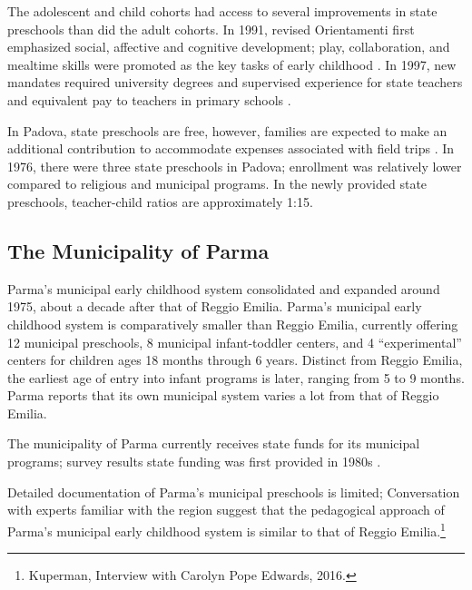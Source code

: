 The adolescent and child cohorts had access to several improvements in state preschools than did the adult cohorts. In 1991, revised Orientamenti first emphasized social, affective and cognitive development; play, collaboration, and mealtime skills were promoted as the key tasks of early childhood \citep{Corsaro_1996_Early-Edu}. In 1997, new mandates required university degrees and supervised experience for state teachers and equivalent pay to teachers in primary schools \citep{Ghedini_2001_Ital-Natl-Policy}. 

In Padova, state preschools are free, however, families are expected to make an additional contribution to accommodate expenses associated with field trips \citep{CEHD_2016_Historical-Analysis}. In 1976, there were three state preschools in Padova; enrollment was relatively lower compared to religious and municipal programs. In the newly provided state preschools, teacher-child ratios are approximately 1:15.

\subsection{The Municipality of Parma}

Parma's municipal early childhood system consolidated and expanded around 1975, about a decade after that of Reggio Emilia. Parma's municipal early childhood system is comparatively smaller than Reggio Emilia, currently offering 12 municipal preschools, 8 municipal infant-toddler centers, and 4 ``experimental'' centers for children ages 18 months through 6 years. Distinct from Reggio Emilia, the earliest age of entry into infant programs is later, ranging from 5 to 9 months. Parma reports that its own municipal system varies a lot from that of Reggio Emilia. 

The municipality of Parma currently receives state funds for its municipal programs; survey results state funding was first provided in 1980s \citep{CEHD_2016_Historical-Analysis}.

Detailed documentation of Parma's municipal preschools is limited; Conversation with experts familiar with the region suggest that the pedagogical approach of Parma's municipal early childhood system is similar to that of Reggio Emilia.\footnote{Kuperman, Interview with Carolyn Pope Edwards, 2016.} 

